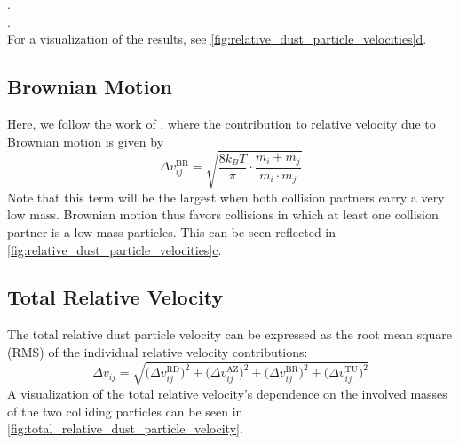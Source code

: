         . \\
        . \\

        For a visualization of the results, see \hyperref[fig:relative_dust_particle_velocities]
        {\cref*{fig:relative_dust_particle_velocities}d}.

    \subsection{Brownian Motion}

        Here, we follow the work of \cite{dullemond_dominik_2004}, where the contribution to 
        relative velocity due to Brownian motion is given by
        \begin{equation}
            \Delta v_{ij}^\text{BR}
            =\sqrt{\frac{8k_BT}{\pi}\cdot\frac{m_i+m_j}{m_i\cdot m_j}}
        \end{equation}
        Note that this term will be the largest when both collision partners carry a very low mass.
        Brownian motion thus favors collisions in which at least one collision partner is a 
        low-mass particles. This can be seen reflected in 
        \hyperref[fig:relative_dust_particle_velocities]{
        \cref*{fig:relative_dust_particle_velocities}c}.

    \subsection{Total Relative Velocity}

        The total relative dust particle velocity can be expressed as the root mean square (RMS) of 
        the individual relative velocity contributions:
        \begin{equation}
            \Delta v_{ij}
                = \sqrt{
                    \big(\Delta v^\text{RD}_{ij}\big)^2
                    + \big(\Delta v^\text{AZ}_{ij}\big)^2
                    + \big(\Delta v^\text{BR}_{ij}\big)^2
                    + \big(\Delta v^\text{TU}_{ij}\big)^2
                }
        \end{equation}
        A visualization of the total relative velocity's dependence on the involved masses of the
        two colliding particles can be seen in \cref{fig:total_relative_dust_particle_velocity}.

        
        

